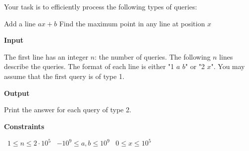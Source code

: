 Your task is to efficiently process the following types of queries:

Add a line $ax+b$
Find the maximum point in any line at position $x$

\vspace{0.3cm}\noindent\textbf{Input}

The first line has an integer $n$: the number of queries.
The following $n$ lines describe the queries. The format of each line is either "1 $a$ $b$" or "2 $x$".
You may assume that the first query is of type 1.

\vspace{0.3cm}\noindent\textbf{Output}

Print the answer for each query of type 2.

\vspace{0.3cm}\noindent\textbf{Constraints}

\textbullet\ $1 \le n \le 2 \cdot 10^5$
\textbullet\ $-10^9 \le a,b \le 10^9$
\textbullet\ $0 \le x \le 10^5$
